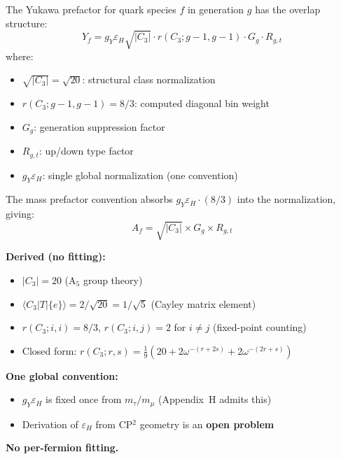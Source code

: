 \begin{proposition}\label{prop:Af_closure}
The Yukawa prefactor for quark species $f$ in generation $g$ has the overlap structure:
\begin{equation}
Y_f = g_Y \varepsilon_H \sqrt{|C_3|} \cdot r(C_3; g{-}1, g{-}1) \cdot G_g \cdot R_{g,t}
\end{equation}
where:
\begin{itemize}[nosep]
\item $\sqrt{|C_3|} = \sqrt{20}$: structural class normalization
\item $r(C_3; g{-}1, g{-}1) = 8/3$: computed diagonal bin weight
\item $G_g$: generation suppression factor
\item $R_{g,t}$: up/down type factor
\item $g_Y \varepsilon_H$: single global normalization (one convention)
\end{itemize}
\end{proposition}

The mass prefactor convention absorbs $g_Y \varepsilon_H \cdot (8/3)$ into the 
normalization, giving:
\begin{equation}
\boxed{A_f = \sqrt{|C_3|} \times G_g \times R_{g,t}}
\end{equation}

\begin{tcolorbox}[colback=blue!5!white, colframe=blue!60!black, 
  title=Closure Status: What Is Derived vs.\ Convention]

\textbf{Derived (no fitting):}
\begin{itemize}[nosep]
\item $|C_3| = 20$ (A$_5$ group theory)
\item $\langle C_3|T|\{e\}\rangle = 2/\sqrt{20} = 1/\sqrt{5}$ (Cayley matrix element)
\item $r(C_3; i,i) = 8/3$, $r(C_3; i,j) = 2$ for $i \neq j$ (fixed-point counting)
\item Closed form: $r(C_3;r,s) = \frac{1}{9}(20 + 2\omega^{-(r+2s)} + 2\omega^{-(2r+s)})$
\end{itemize}

\textbf{One global convention:}
\begin{itemize}[nosep]
\item $g_Y \varepsilon_H$ is fixed once from $m_\tau/m_\mu$ (Appendix~H admits this)
\item Derivation of $\varepsilon_H$ from CP$^2$ geometry is an \textbf{open problem}
\end{itemize}

\textbf{No per-fermion fitting.}
\end{tcolorbox}

